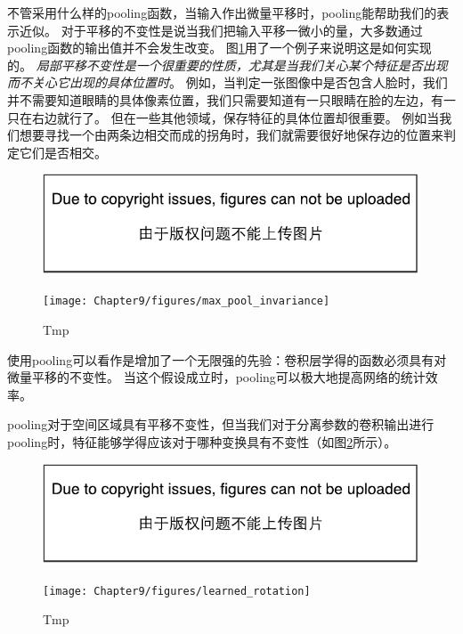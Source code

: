 不管采用什么样的\gls{pooling}函数，当输入作出微量平移时，\gls{pooling}能帮助我们的表示近似。
对于平移的不变性是说当我们把输入平移一微小的量，大多数通过\gls{pooling}函数的输出值并不会发生改变。
图\ref{fig:chap9_max_pool_invariance}用了一个例子来说明这是如何实现的。
\emph{局部平移不变性是一个很重要的性质，尤其是当我们关心某个特征是否出现而不关心它出现的具体位置时}。
例如，当判定一张图像中是否包含人脸时，我们并不需要知道眼睛的具体像素位置，我们只需要知道有一只眼睛在脸的左边，有一只在右边就行了。
但在一些其他领域，保存特征的具体位置却很重要。
例如当我们想要寻找一个由两条边相交而成的拐角时，我们就需要很好地保存边的位置来判定它们是否相交。
\begin{figure}[!htb]
\ifOpenSource
\centerline{\includegraphics{figure.pdf}}
\else
\centerline{\texttt{[image: Chapter9/figures/max\_pool\_invariance]}}
\fi
\caption{Tmp}
\label{fig:chap9_max_pool_invariance}
\end{figure}

 
使用\gls{pooling}可以看作是增加了一个无限强的先验：卷积层学得的函数必须具有对微量平移的不变性。
当这个假设成立时，\gls{pooling}可以极大地提高网络的统计效率。

\gls{pooling}对于空间区域具有平移不变性，但当我们对于分离参数的卷积输出进行\gls{pooling}时，特征能够学得应该对于哪种变换具有不变性（如图\ref{fig:chap9_learned_rotation}所示）。
\begin{figure}[!htb]
\ifOpenSource
\centerline{\includegraphics{figure.pdf}}
\else
\centerline{\texttt{[image: Chapter9/figures/learned\_rotation]}}
\fi
\caption{Tmp}
\label{fig:chap9_learned_rotation}
\end{figure}

 
